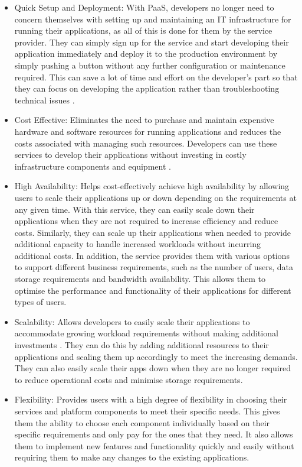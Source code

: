\documentclass[BIF,Master,nenglish]{twbook}%
\begin{document}
\begin{itemize}
\item Quick Setup and Deployment: With PaaS, developers no longer need to concern themselves with setting up and maintaining an IT infrastructure for running their applications, as all of this is done for them by the service provider. They can simply sign up for the service and start developing their application immediately and deploy it to the production environment by simply pushing a button without any further configuration or maintenance required. This can save a lot of time and effort on the developer's part so that they can focus on developing the application rather than troubleshooting technical issues \cite{law2008}.

\item Cost Effective: Eliminates the need to purchase and maintain expensive hardware and software resources for running applications and reduces the costs associated with managing such resources. Developers can use these services to develop their applications without investing in costly infrastructure components and equipment \cite{gai2014}.

\item High Availability: Helps cost-effectively achieve high availability by allowing users to scale their applications up or down depending on the requirements at any given time. With this service, they can easily scale down their applications when they are not required to increase efficiency and reduce costs. Similarly, they can scale up their applications when needed to provide additional capacity to handle increased workloads without incurring additional costs. In addition, the service provides them with various options to support different business requirements, such as the number of users, data storage requirements and bandwidth availability. This allows them to optimise the performance and functionality of their applications for different types of users. 

\item Scalability: Allows developers to easily scale their applications to accommodate growing workload requirements without making additional investments \cite{law2008}. They can do this by adding additional resources to their applications and scaling them up accordingly to meet the increasing demands. They can also easily scale their apps down when they are no longer required to reduce operational costs and minimise storage requirements.

\item Flexibility: Provides users with a high degree of flexibility in choosing their services and platform components to meet their specific needs. This gives them the ability to choose each component individually based on their specific requirements and only pay for the ones that they need. It also allows them to implement new features and functionality quickly and easily without requiring them to make any changes to the existing applications. 
\end{itemize}
\end{document}
